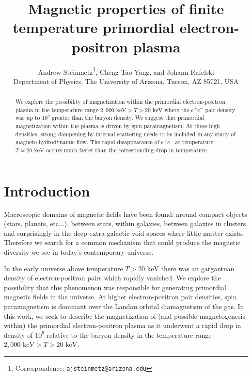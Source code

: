 \documentclass[a4paper]{article}
\title{\boldmath Magnetic properties of finite temperature primordial electron-positron plasma}
\author{Andrew Steinmetz\orc{\orcC}\thanks{Correspondence: \texttt{ajsteinmetz@arizona.edu}}, Cheng Tao Yang\orc{\orcB}, and Johann Rafelski\orc{\orcA}\\ Department of Physics, The University of Arizona, Tucson, AZ 85721, USA}
\newcommand*{\keV}{\text{ keV}}
\begin{document}
\maketitle

\begin{abstract}
    We explore the possibility of magnetization within the primordial electron-positron plasma in the temperature range $2,000\keV>T>20\keV$ where the $e^{+}e^{-}$ pair density was up to $10^{9}$ greater than the baryon density. We suggest that primordial magnetization within the plasma is driven by spin paramagnetism. At these high densities, strong dampening by internal scattering needs to be included in any study of magneto-hydrodynamic flow. The rapid disappearance of $e^{+}e^{-}$ at temperature $T\simeq20\keV$ occurs much faster than the corresponding drop in temperature.
\end{abstract}


\section{Introduction}\label{sec:introduction}
\noindent Macroscopic domains of magnetic fields have been found: around compact objects (stars, planets, etc...), between stars, within galaxies, between galaxies in clusters, and surprisingly in the deep extra-galactic void spaces where little matter exists. Therefore we search for a common mechanism that could produce the magnetic diversity we see in today's contemporary universe.

In the early universe above temperature $T>20\keV$ there was an gargantuan density of electron-positron pairs which rapidly vanished. We explore the possibility that this phenomenon was responsible for generating primordial magnetic fields in the universe. At higher electron-positron pair densities, spin paramagnetism is dominant over the Landau orbital diamagnetism of the gas. In this work, we seek to describe the magnetization of (and possible magnetogenesis within) the primordial electron-positron plasma as it underwent a rapid drop in density of $10^{9}$ relative to the baryon density in the temperature range $2,000\keV>T>20\keV$.
\end{document}
